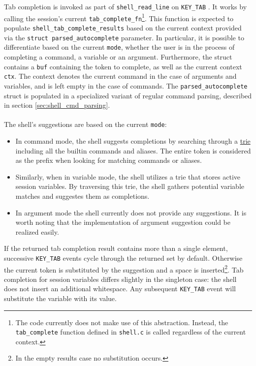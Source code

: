 Tab completion is invoked as part of \texttt{shell\_read\_line} on \texttt{KEY\_TAB} \keys{\tab}. It works by calling the session's current \texttt{tab\_complete\_fn}\footnote{The code currently does not make use of this abstraction. Instead, the \texttt{tab\_complete} function defined in \texttt{shell.c} is called regardless of the current context.}. This function is expected to populate \texttt{shell\_tab\_complete\_results} based on the current context provided via the \texttt{struct parsed\_autocomplete} parameter. In particular, it is possible to differentiate based on the current \texttt{mode}, whether the user is in the process of completing a command, a variable or an argument. Furthermore, the struct contains a \texttt{buf} containing the token to complete, as well as the current context \texttt{ctx}. The context denotes the current command in the case of arguments and variables, and is left empty in the case of commands. The \texttt{parsed\_autocomplete} struct is populated in a specialized variant of regular command parsing, described in section \ref{sec:shell_cmd_parsing}. 
\\ \\
\smallskip 
The shell's suggestions are based on the current \texttt{mode}:
\begin{itemize}
	\item In command mode, the shell suggests completions by searching through a \href{https://en.wikipedia.org/wiki/Trie}{trie} including all the builtin commands and aliases. The entire token is considered as the prefix when looking for matching commands or aliases.
	\item Similarly, when in variable mode, the shell utilizes a trie that stores active session variables. By traversing this trie, the shell gathers potential variable matches and suggestes them as completions.
	\item In argument mode the shell currently does not provide any suggestions. It is worth noting that the implementation of argument suggestion could be realized easily.
\end{itemize}

If the returned tab completion result contains more than a single element, successive \texttt{KEY\_TAB} \keys{\tab} events cycle through the returned set by default. Otherwise the current token is substituted by the suggestion and a space is inserted\footnote{In the empty results case no substitution occurs.}. Tab completion for session variables differs slightly in the singleton case: the shell does not insert an additional whitespace. Any subsequent \texttt{KEY\_TAB} \keys{\tab} event will substitute the variable with its value.


